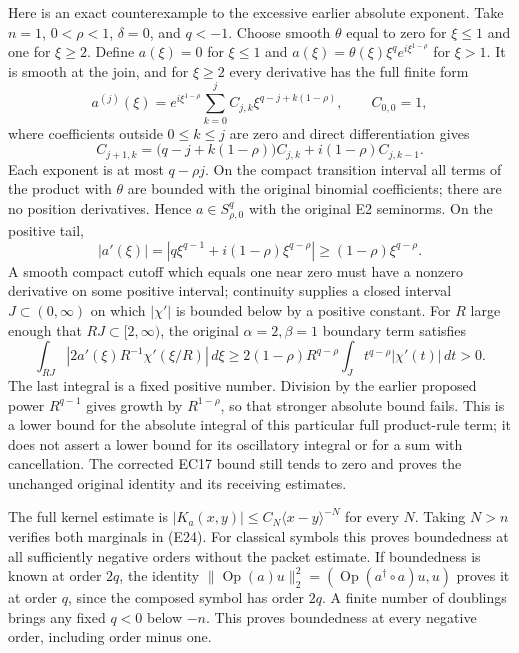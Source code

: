 \documentclass[
  11pt,
]{article}
\begin{document}
Here is an exact counterexample to the excessive earlier absolute
exponent. Take \(n=1\), \(0<\rho<1\), \(\delta=0\), and \(q<-1\). Choose
smooth \(\theta\) equal to zero for \(\xi\leq1\) and one for
\(\xi\geq2\). Define \(a(\xi)=0\) for \(\xi\leq1\) and
\(a(\xi)=\theta(\xi)\xi^q e^{i\xi^{1-\rho}}\) for \(\xi>1\). It is
smooth at the join, and for \(\xi\geq2\) every derivative has the full
finite form \[
 a^{(j)}(\xi)=e^{i\xi^{1-\rho}}
       \sum_{k=0}^j C_{j,k}\xi^{q-j+k(1-\rho)},
 \qquad C_{0,0}=1,
 \tag{EC18}
\] where coefficients outside \(0\leq k\leq j\) are zero and direct
differentiation gives \[
 C_{j+1,k}=\bigl(q-j+k(1-\rho)\bigr)C_{j,k}
                  +i(1-\rho)C_{j,k-1}.
 \tag{EC19}
\] Each exponent is at most \(q-\rho j\). On the compact transition
interval all terms of the product with \(\theta\) are bounded with the
original binomial coefficients; there are no position derivatives. Hence
\(a\in S^q_{\rho,0}\) with the original E2 seminorms. On the positive
tail, \[
 |a'(\xi)|=\left|q\xi^{q-1}+i(1-\rho)\xi^{q-\rho}\right|
                 \geq(1-\rho)\xi^{q-\rho}.
 \tag{EC20}
\] A smooth compact cutoff which equals one near zero must have a
nonzero derivative on some positive interval; continuity supplies a
closed interval \(J\subset(0,\infty)\) on which \(|\chi'|\) is bounded
below by a positive constant. For \(R\) large enough that
\(RJ\subset[2,\infty)\), the original \(\alpha=2,\beta=1\) boundary term
satisfies \[
 \int_{RJ}\left|2a'(\xi)R^{-1}\chi'(\xi/R)\right|\,d\xi
 \geq2(1-\rho)R^{q-\rho}
            \int_J t^{q-\rho}|\chi'(t)|\,dt>0.
 \tag{EC21}
\] The last integral is a fixed positive number. Division by the earlier
proposed power \(R^{q-1}\) gives growth by \(R^{1-\rho}\), so that
stronger absolute bound fails. This is a lower bound for the absolute
integral of this particular full product-rule term; it does not assert a
lower bound for its oscillatory integral or for a sum with cancellation.
The corrected EC17 bound still tends to zero and proves the unchanged
original identity and its receiving estimates.

The full kernel estimate is
\(|K_a(x,y)|\leq C_N\langle x-y\rangle^{-N}\) for every \(N\). Taking
\(N>n\) verifies both marginals in (E24). For classical symbols this
proves boundedness at all sufficiently negative orders without the
packet estimate. If boundedness is known at order \(2q\), the identity
\(\|\operatorname{Op}(a)u\|_2^2=(\operatorname{Op}(a^\dagger\circ a)u,u)\)
proves it at order \(q\), since the composed symbol has order \(2q\). A
finite number of doublings brings any fixed \(q<0\) below \(-n\). This
proves boundedness at every negative order, including order minus one.
\end{document}
